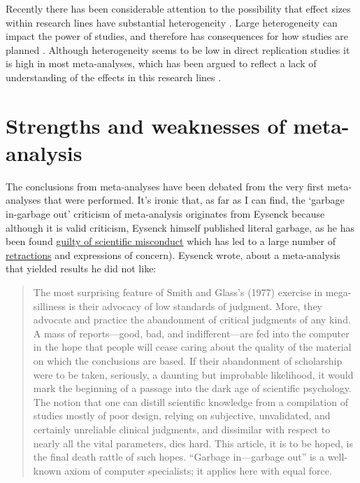 \documentclass[
  oneside]{book}
\begin{document}
Recently there has been considerable attention to the possibility that effect sizes within research lines have substantial heterogeneity \citep{bryan_behavioural_2021}. Large heterogeneity can impact the power of studies, and therefore has consequences for how studies are planned \citep{kenny_unappreciated_2019}. Although heterogeneity seems to be low in direct replication studies \citep{olsson-collentine_heterogeneity_2020} it is high in most meta-analyses, which has been argued to reflect a lack of understanding of the effects in this research lines \citep{linden_heterogeneity_2021}.

\hypertarget{strengths-and-weaknesses-of-meta-analysis}{%
\section{Strengths and weaknesses of meta-analysis}\label{strengths-and-weaknesses-of-meta-analysis}}

The conclusions from meta-analyses have been debated from the very first meta-analyses that were performed. It's ironic that, as far as I can find, the `garbage in-garbage out' criticism of meta-analysis originates from Eysenck \citeyearpar{eysenck_exercise_1978} because although it is valid criticism, Eysenck himself published literal garbage, as he has been found \href{https://www.science.org/content/article/misconduct-allegations-push-psychology-hero-his-pedestal}{guilty of scientific misconduct} which has led to a large number of \href{http://retractiondatabase.org/RetractionSearch.aspx?AspxAutoDetectCookieSupport=1\#?AspxAutoDetectCookieSupport\%3d1\%26auth\%3dEysenck\%252c\%2bHans\%2bJ}{retractions} and expressions of concern). Eysenck wrote, about a meta-analysis that yielded results he did not like:

\begin{quote}
The most surprising feature of Smith and Glass's (1977) exercise in mega-silliness is their advocacy of low standards of judgment. More, they advocate and practice the abandonment of critical judgments of any kind. A mass of reports---good, bad, and indifferent---are fed into the
computer in the hope that people will cease caring about the quality of the material on which the conclusions are based. If their abandonment of scholarship were to be taken, seriously, a daunting but improbable likelihood, it would mark the beginning of a passage into the dark age of scientific psychology.
The notion that one can distill scientific knowledge from a compilation of studies mostly of poor design, relying on subjective, unvalidated, and certainly unreliable clinical judgments, and dissimilar with respect to nearly all the vital parameters, dies hard. This article, it is to be hoped, is the final death rattle of such hopes. ``Garbage in---garbage out'' is a well-known axiom of computer specialists; it applies here with equal force.
\end{quote}
\end{document}
